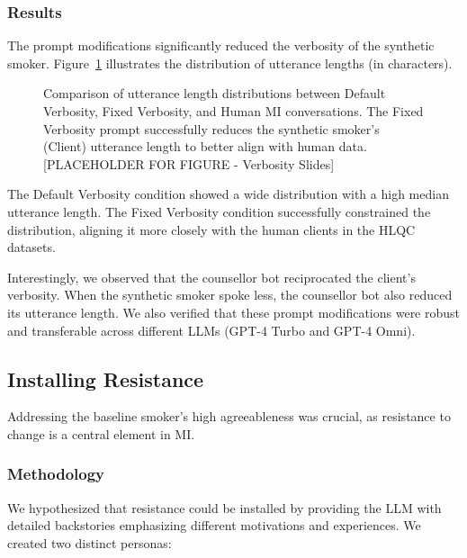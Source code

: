 \subsubsection{Results}

The prompt modifications significantly reduced the verbosity of the synthetic smoker. Figure~\ref{fig:verbosity-comparison} illustrates the distribution of utterance lengths (in characters).

\begin{figure}[ht]
    \centering
    \caption{Comparison of utterance length distributions between Default Verbosity, Fixed Verbosity, and Human MI conversations. The Fixed Verbosity prompt successfully reduces the synthetic smoker's (Client) utterance length to better align with human data. [PLACEHOLDER FOR FIGURE - Verbosity Slides]}
    \label{fig:verbosity-comparison}
\end{figure}

The Default Verbosity condition showed a wide distribution with a high median utterance length. The Fixed Verbosity condition successfully constrained the distribution, aligning it more closely with the human clients in the HLQC datasets.

Interestingly, we observed that the counsellor bot reciprocated the client's verbosity. When the synthetic smoker spoke less, the counsellor bot also reduced its utterance length. We also verified that these prompt modifications were robust and transferable across different LLMs (GPT-4 Turbo and GPT-4 Omni).

\subsection{Installing Resistance}
\label{sec:synthetic-smoker-resistance}

Addressing the baseline smoker's high agreeableness was crucial, as resistance to change is a central element in MI.

\subsubsection{Methodology}
We hypothesized that resistance could be installed by providing the LLM with detailed backstories emphasizing different motivations and experiences. We created two distinct personas:

